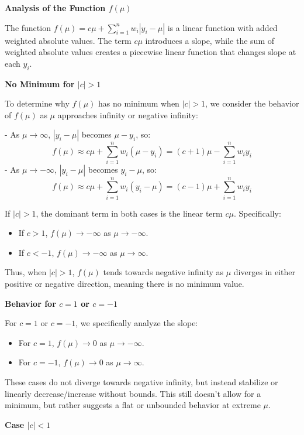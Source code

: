 \documentclass[8pt]{article}
\begin{document}
{\textbf{Analysis of the Function \( f(\mu) \)}

The function \( f(\mu) = c\mu + \sum_{i=1}^{n} w_i |y_i - \mu| \) is a linear function with added weighted absolute values. The term \( c\mu \) introduces a slope, while the sum of weighted absolute values creates a piecewise linear function that changes slope at each \( y_i \).

\textbf{No Minimum for \( |c| > 1 \)}

To determine why \( f(\mu) \) has no minimum when \( |c| > 1 \), we consider the behavior of \( f(\mu) \) as \( \mu \) approaches infinity or negative infinity:

- As \( \mu \to \infty \), \( |y_i - \mu| \) becomes \( \mu - y_i \), so:
  \[
  f(\mu) \approx c\mu + \sum_{i=1}^{n} w_i (\mu - y_i) = (c + 1)\mu - \sum_{i=1}^{n} w_i y_i
  \]
- As \( \mu \to -\infty \), \( |y_i - \mu| \) becomes \( y_i - \mu \), so:
  \[
  f(\mu) \approx c\mu + \sum_{i=1}^{n} w_i (y_i - \mu) = (c - 1)\mu + \sum_{i=1}^{n} w_i y_i
  \]

If \( |c| > 1 \), the dominant term in both cases is the linear term \( c\mu \). Specifically:
\begin{itemize}
    \item If \( c > 1 \), \( f(\mu) \to -\infty \) as \( \mu \to -\infty \).
    \item If \( c < -1 \), \( f(\mu) \to -\infty \) as \( \mu \to \infty \).
\end{itemize}

Thus, when \( |c| > 1 \), \( f(\mu) \) tends towards negative infinity as \( \mu \) diverges in either positive or negative direction, meaning there is no minimum value.

\textbf{Behavior for \( c = 1 \) or \( c = -1 \)}

For \( c = 1 \) or \( c = -1 \), we specifically analyze the slope:
\begin{itemize}
    \item For \( c = 1 \), \( f(\mu) \to 0 \) as \( \mu \to -\infty \).
    \item For \( c = -1 \), \( f(\mu) \to 0 \) as \( \mu \to \infty \).
\end{itemize}

These cases do not diverge towards negative infinity, but instead stabilize or linearly decrease/increase without bounds. This still doesn't allow for a minimum, but rather suggests a flat or unbounded behavior at extreme \( \mu \).

\textbf{Case \( |c| < 1 \)}

}
\end{document}
